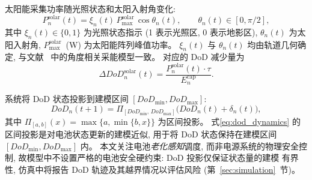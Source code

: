 \documentclass[a4paper,11pt]{article}
\begin{document}
太阳能采集功率随光照状态和太阳入射角变化:
\begin{equation}
    P^{\mathrm{solar}}_n(t) = \xi_n(t)\, P^{\mathrm{solar}}_{\max}\,
    \cos\theta_n(t),
    \qquad \theta_n(t) \in [0, \pi/2],
    \label{eq:solar_power}
\end{equation}
其中 $\xi_n(t) \in \{0, 1\}$ 为光照状态指示 (1 表示光照区,
0 表示地影区), $\theta_n(t)$ 为太阳入射角, 
$P^{\mathrm{solar}}_{\max}$~(W) 为太阳能阵列峰值功率。
$\xi_n(t)$ 与 $\theta_n(t)$ 均由轨道几何确定, 
与文献~\cite{li2024battery} 中的角度相关采能模型一致。
对应的 DoD 减少量为
\begin{equation}
    \Delta DoD^{\mathrm{solar}}_n(t)
    = \frac{P^{\mathrm{solar}}_n(t) \cdot \tau}{E^{\mathrm{cap}}_n}.
    \label{eq:dod_solar}
\end{equation}



系统将 DoD 状态投影到建模区间 $[DoD_{\min}, DoD_{\max}]$:
\begin{equation}
    DoD_n(t+1) = 
    \Pi_{[DoD_{\min},\, DoD_{\max}]}\!\big(
    DoD_n(t) + \delta_n(t)\big),
    \label{eq:dod_dynamics}
\end{equation}
其中 $\Pi_{[a,b]}(x) = \max\{a, \min\{b, x\}\}$ 为区间投影。
式\eqref{eq:dod_dynamics} 的区间投影是对电池状态更新的建模近似,
用于将 DoD 状态保持在建模区间 $[DoD_{\min}, DoD_{\max}]$ 内。
本文关注电池\emph{老化感知}调度, 而非电源系统的物理安全控制,
故模型中不设置严格的电池安全硬约束: DoD 投影仅保证状态量的建模
有界性, 仿真中将报告 DoD 轨迹及其越界情况以评估风险
(第~\ref{sec:simulation}~节)。
\end{document}

